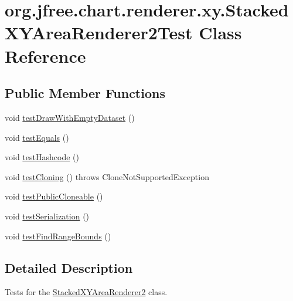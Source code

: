 \hypertarget{classorg_1_1jfree_1_1chart_1_1renderer_1_1xy_1_1_stacked_x_y_area_renderer2_test}{}\section{org.\+jfree.\+chart.\+renderer.\+xy.\+Stacked\+X\+Y\+Area\+Renderer2\+Test Class Reference}
\label{classorg_1_1jfree_1_1chart_1_1renderer_1_1xy_1_1_stacked_x_y_area_renderer2_test}
\subsection*{Public Member Functions}
\begin{DoxyCompactItemize}
\item 
void \mbox{\hyperlink{classorg_1_1jfree_1_1chart_1_1renderer_1_1xy_1_1_stacked_x_y_area_renderer2_test_a9ba3f0751540ab96ea9338740c2fc064}{test\+Draw\+With\+Empty\+Dataset}} ()
\item 
void \mbox{\hyperlink{classorg_1_1jfree_1_1chart_1_1renderer_1_1xy_1_1_stacked_x_y_area_renderer2_test_ab8d5e35846912c30b31bf1bfba48b02a}{test\+Equals}} ()
\item 
void \mbox{\hyperlink{classorg_1_1jfree_1_1chart_1_1renderer_1_1xy_1_1_stacked_x_y_area_renderer2_test_acbc691c1ec7dc80d268adddcc7ffdce1}{test\+Hashcode}} ()
\item 
void \mbox{\hyperlink{classorg_1_1jfree_1_1chart_1_1renderer_1_1xy_1_1_stacked_x_y_area_renderer2_test_aa3d611b20747bc9d87144511c16a857f}{test\+Cloning}} ()  throws Clone\+Not\+Supported\+Exception 
\item 
void \mbox{\hyperlink{classorg_1_1jfree_1_1chart_1_1renderer_1_1xy_1_1_stacked_x_y_area_renderer2_test_aae88e0e0cd0931e6d0544b243ba76bf7}{test\+Public\+Cloneable}} ()
\item 
void \mbox{\hyperlink{classorg_1_1jfree_1_1chart_1_1renderer_1_1xy_1_1_stacked_x_y_area_renderer2_test_af4014b5cec4084b6fc88569f290f17bc}{test\+Serialization}} ()
\item 
void \mbox{\hyperlink{classorg_1_1jfree_1_1chart_1_1renderer_1_1xy_1_1_stacked_x_y_area_renderer2_test_acc922ab32ca89f2596d0de3c2008da62}{test\+Find\+Range\+Bounds}} ()
\end{DoxyCompactItemize}


\subsection{Detailed Description}
Tests for the \mbox{\hyperlink{classorg_1_1jfree_1_1chart_1_1renderer_1_1xy_1_1_stacked_x_y_area_renderer2}{Stacked\+X\+Y\+Area\+Renderer2}} class. 

